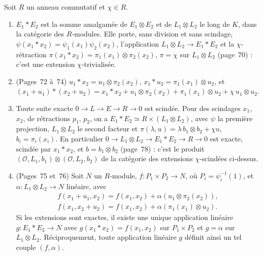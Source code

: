 \begin{encadre}
\begin{theoreme}
Soit $R$ un anneau commutatif et $\chi \in R$.
\begin{enumerate}
\item $E_1 * E_2$ est la somme amalgamée de $E_1 \otimes E_2$ et de $L_1 \otimes L_2$ le long de $K$, dans la catégorie des $R$-modules. Elle porte, sans division et sans scindage, $\psi(x_1 * x_2) = \psi_1(x_1)\psi_2(x_2)$, l'application $L_1 \otimes L_2 \to E_1 * E_2$ et la $\chi$-rétraction $\pi(x_1 * x_2) = \pi_1(x_1) \otimes \pi_2(x_2)$, $\pi = \chi$ sur $L_1 \otimes L_2$ (page~70) : c'est une extension $\chi$-trivialisée.
\item (Pages~72 à~74) $u_1 * x_2 = u_1 \otimes \pi_2(x_2)$, $x_1 * u_2 = \pi_1(x_1) \otimes u_2$, et $(x_1 + u_1) * (x_2 + u_2) = x_1 * x_2 + u_1 \otimes \pi_2(x_2) + \pi_1(x_1) \otimes u_2 + \chi\,u_1 \otimes u_2$.
\item Toute suite exacte $0 \to L \to E \to R \to 0$ est scindée. Pour des scindages $x_1$, $x_2$, de rétractions $p_1$, $p_2$, on a $E_1 * E_2 \simeq R \times (L_1 \otimes L_2)$, avec $\psi$ la première projection, $L_1 \otimes L_2$ le second facteur et $\pi(\lambda, u) = \lambda\, b_1 \otimes b_2 + \chi u$, $b_i = \pi_i(x_i)$. En particulier $0 \to L_1 \otimes L_2 \to E_1 * E_2 \to R \to 0$ est exacte, scindée par $x_1 * x_2$, et $b = b_1 \otimes b_2$ (page~78) : c'est le produit $(\mathcal O, L_1, b_1) \otimes (\mathcal O, L_2, b_2)$ de la catégorie des extensions $\chi$-scindées ci-dessus.
\item (Pages~75 et~76) Soit $N$ un $R$-module, $f : P_1 \times P_2 \to N$, où $P_i = \psi_i^{-1}(1)$, et $\alpha : L_1 \otimes L_2 \to N$ linéaire, avec
\[ \begin{gathered} f(x_1 + u_1, x_2) = f(x_1, x_2) + \alpha(u_1 \otimes \pi_2(x_2)), \\ f(x_1, x_2 + u_2) = f(x_1, x_2) + \alpha(\pi_1(x_1) \otimes u_2). \end{gathered} \]
Si les extensions sont exactes, il existe une unique application linéaire $g : E_1 * E_2 \to N$ avec $g(x_1 * x_2) = f(x_1, x_2)$ sur $P_1 \times P_2$ et $g = \alpha$ sur $L_1 \otimes L_2$. Réciproquement, toute application linéaire $g$ définit ainsi un tel couple $(f, \alpha)$.
\end{enumerate}
\end{theoreme}
\end{encadre}

